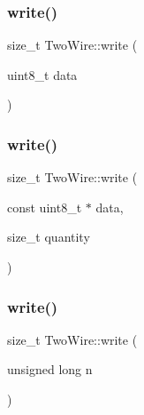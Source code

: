 \mbox{\label{class_two_wire_a318b7bec156c1f1075a818c0ad3427d7}} 
\subsubsection{\texorpdfstring{write()}{write()}\hspace{0.1cm}{\footnotesize\ttfamily [1/6]}}
{\footnotesize\ttfamily size\+\_\+t Two\+Wire\+::write (\begin{DoxyParamCaption}\item[{uint8\+\_\+t}]{data }\end{DoxyParamCaption})\hspace{0.3cm}{\ttfamily [virtual]}}

\mbox{\label{class_two_wire_a1957b4d5a6a997bdde436e9e40d131a7}} 
\subsubsection{\texorpdfstring{write()}{write()}\hspace{0.1cm}{\footnotesize\ttfamily [2/6]}}
{\footnotesize\ttfamily size\+\_\+t Two\+Wire\+::write (\begin{DoxyParamCaption}\item[{const uint8\+\_\+t $\ast$}]{data,  }\item[{size\+\_\+t}]{quantity }\end{DoxyParamCaption})\hspace{0.3cm}{\ttfamily [virtual]}}

\mbox{\label{class_two_wire_a0c9d09ead8fcddf2a84781fe77d3c975}} 
\subsubsection{\texorpdfstring{write()}{write()}\hspace{0.1cm}{\footnotesize\ttfamily [3/6]}}
{\footnotesize\ttfamily size\+\_\+t Two\+Wire\+::write (\begin{DoxyParamCaption}\item[{unsigned long}]{n }\end{DoxyParamCaption})\hspace{0.3cm}{\ttfamily [inline]}}

